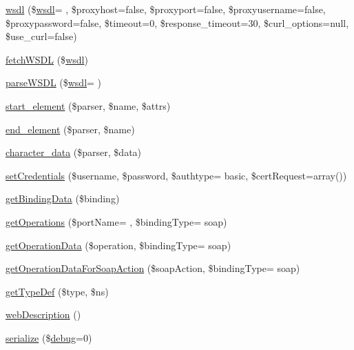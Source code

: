 \begin{DoxyCompactItemize}
\item 
\hyperlink{classwsdl_a5b4366809907087aa8d55a24472b310e}{wsdl} (\$\hyperlink{classwsdl}{wsdl}= \textquotesingle{}\textquotesingle{}, \$proxyhost=false, \$proxyport=false, \$proxyusername=false, \$proxypassword=false, \$timeout=0, \$response\+\_\+timeout=30, \$curl\+\_\+options=null, \$use\+\_\+curl=false)
\item 
\hyperlink{classwsdl_aa7cee5d5e5c547aa5bb471579bcc7a19}{fetch\+W\+S\+D\+L} (\$\hyperlink{classwsdl}{wsdl})
\item 
\hyperlink{classwsdl_aef0643f32c7dca703065cc3eb3fd1dba}{parse\+W\+S\+D\+L} (\$\hyperlink{classwsdl}{wsdl}= \textquotesingle{}\textquotesingle{})
\item 
\hyperlink{classwsdl_abf9dc4b028eeac08eeca4c7309a950e2}{start\+\_\+element} (\$parser, \$name, \$attrs)
\item 
\hyperlink{classwsdl_ad45367c512cbc2d4679d1a49db3802f2}{end\+\_\+element} (\$parser, \$name)
\item 
\hyperlink{classwsdl_a592a4f9b601cc33f15de0ad7a9c49ae5}{character\+\_\+data} (\$parser, \$data)
\item 
\hyperlink{classwsdl_ada213133d177c1c9c07435d65e89e735}{set\+Credentials} (\$username, \$password, \$authtype= \textquotesingle{}basic\textquotesingle{}, \$cert\+Request=array())
\item 
\hyperlink{classwsdl_ae6385888eeb57e98ef81323b05842341}{get\+Binding\+Data} (\$binding)
\item 
\hyperlink{classwsdl_aea628ff93cbcda102e27c3e5e77596ac}{get\+Operations} (\$port\+Name= \textquotesingle{}\textquotesingle{}, \$binding\+Type= \textquotesingle{}soap\textquotesingle{})
\item 
\hyperlink{classwsdl_a38f29f3212405560a4bcf188ad632e1f}{get\+Operation\+Data} (\$operation, \$binding\+Type= \textquotesingle{}soap\textquotesingle{})
\item 
\hyperlink{classwsdl_a5a538dc2c7da9f6f6d6880751318762b}{get\+Operation\+Data\+For\+Soap\+Action} (\$soap\+Action, \$binding\+Type= \textquotesingle{}soap\textquotesingle{})
\item 
\hyperlink{classwsdl_a327b3186f4e3c8b71431ce4a9db77e5a}{get\+Type\+Def} (\$type, \$ns)
\item 
\hyperlink{classwsdl_a43ffc8c82e99905b889fbeb93d4ca6eb}{web\+Description} ()
\item 
\hyperlink{classwsdl_a25fcce1ac19624739857406748ba332a}{serialize} (\$\hyperlink{classnusoap__base_ac652bd9010bd39b0f2854f7ded3f6f33}{debug}=0)

\end{DoxyCompactItemize}
